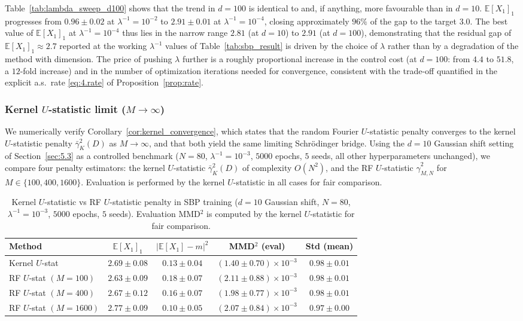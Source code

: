 \documentclass[11pt,leqno]{article}
\theoremstyle{plain}
\theoremstyle{remark}
\theoremstyle{definition}
\numberwithin{equation}{section}
\numberwithin{figure}{section}
\numberwithin{table}{section}
\numberwithin{algorithm}{section}
\newcommand{\EE}{\mathbb{E}}
\begin{document}
Table~\ref{tab:lambda_sweep_d100} shows that the trend in $d=100$ is identical to and, if anything, more favourable than in $d=10$. 
$\EE[X_1]_1$ progresses from $0.96\pm 0.02$ at $\lambda^{-1}=10^{-2}$
to $2.91\pm 0.01$ at $\lambda^{-1}=10^{-4}$,
closing approximately $96\%$ of the gap to the target $3.0$.
The best value of $\EE[X_1]_1$ at $\lambda^{-1}=10^{-4}$ thus lies in the narrow range $2.81$ (at $d=10$) to $2.91$ (at $d=100$),
demonstrating that the residual gap of $\EE[X_1]_1\approx 2.7$
reported at the working $\lambda^{-1}$ values of Table~\ref{tab:sbp_result}
is driven by the choice of $\lambda$ rather than by a degradation of the method with dimension.
The price of pushing $\lambda$ further is a roughly proportional increase in the control cost
(at $d=100$: from $4.4$ to $51.8$, a $12$-fold increase)
and in the number of optimization iterations needed for convergence,
consistent with the trade-off quantified in the explicit a.s.\ rate \eqref{eq:4.rate} of Proposition~\ref{prop:rate}.


\subsubsection{Kernel $U$-statistic limit ($M\to\infty$)}\label{sec:5.4ker}

We numerically verify Corollary~\ref{cor:kernel_convergence}, which states that
the random Fourier $U$-statistic penalty converges to the kernel $U$-statistic penalty $\bar{\gamma}_K^2(D)$ as $M\to\infty$,
and that both yield the same limiting Schr{\"o}dinger bridge.
Using the $d=10$ Gaussian shift setting of Section~\ref{sec:5.3} as a controlled benchmark
($N=80$, $\lambda^{-1}=10^{-3}$, $5000$ epochs, $5$ seeds, all other hyperparameters unchanged),
we compare four penalty estimators: the kernel $U$-statistic $\bar{\gamma}_K^2(D)$
of complexity $O(N^2)$, and the RF $U$-statistic $\hat{\gamma}_{M,N}^2$ for $M\in\{100,400,1600\}$.
Evaluation is performed by the kernel $U$-statistic in all cases for fair comparison.

\begin{table}[htbp]
\centering
\caption{Kernel $U$-statistic vs RF $U$-statistic penalty in SBP training
($d=10$ Gaussian shift, $N=80$, $\lambda^{-1}=10^{-3}$, $5000$ epochs, $5$ seeds).
Evaluation MMD${}^2$ is computed by the kernel $U$-statistic for fair comparison.}
\label{tab:kernel_vs_rf}
\begin{tabular}{lcccc}
\toprule
Method & $\EE[X_1]_1$ & $|\EE[X_1]-m|^2$ & MMD${}^2$ (eval) & Std (mean) \\
\midrule
Kernel $U$-stat       & $2.69\pm 0.08$ & $0.13\pm 0.04$ & $(1.40\pm 0.70)\times 10^{-3}$ & $0.98\pm 0.01$ \\
RF $U$-stat $(M=100)$ & $2.63\pm 0.09$ & $0.18\pm 0.07$ & $(2.11\pm 0.88)\times 10^{-3}$ & $0.98\pm 0.01$ \\
RF $U$-stat $(M=400)$ & $2.67\pm 0.12$ & $0.16\pm 0.07$ & $(1.98\pm 0.77)\times 10^{-3}$ & $0.98\pm 0.01$ \\
RF $U$-stat $(M=1600)$& $2.77\pm 0.09$ & $0.10\pm 0.05$ & $(2.07\pm 0.84)\times 10^{-3}$ & $0.97\pm 0.00$ \\
\bottomrule
\end{tabular}
\end{table}
\end{document}
